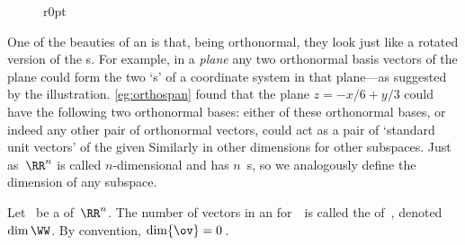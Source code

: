 \begin{figure}r{0pt}
\quad
{} 
\end{figure}
One of the beauties of an  is that, being orthonormal, they look just like a rotated version of the s.
For example, in a \emph{plane} any two orthonormal basis vectors of the plane could form the two `s' of a coordinate system in that plane---as suggested by the illustration.
\cref{eg:orthospan} found that the plane \(z=-x/6+y/3\) could have the following two orthonormal bases: either of these orthonormal bases, or indeed any other pair of orthonormal vectors, could act as a pair of `standard unit vectors' of the given 
Similarly in other dimensions for other subspaces.
Just as~\(\RR^n\) is called \(n\)-dimensional and has \(n\)~s, so we analogously define the dimension of any subspace.

\begin{definition} \label{def:dim} 
Let \WW\ be a  of~\(\RR^n\). 
The number of vectors in an  for~\WW\ is called the  of~\WW, denoted~\(\dim\WW\).
By convention, \(\dim\{\ov\}=0\)\,.
\end{definition}

